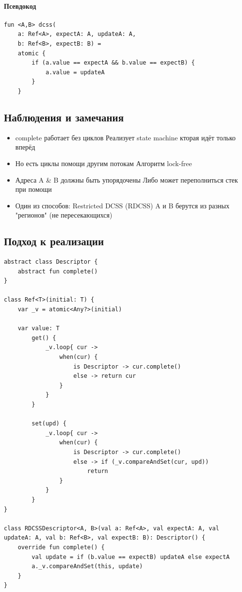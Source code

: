\documentclass[10pt,a4paper,oneside,titlepage]{article}
\theoremstyle{plain}
\theoremstyle{defenition}
\begin{document}
\paragraph{Псевдокод}

\begin{lstlisting}
fun <A,B> dcss(
    a: Ref<A>, expectA: A, updateA: A,
    b: Ref<B>, expectB: B) =
    atomic {
        if (a.value == expectA && b.value == expectB) {
            a.value = updateA
        }
    }
\end{lstlisting}

\subsection{Наблюдения и замечания}

\begin{itemize}
	\item complete работает без циклов
	\subitem Реализует state machine кторая идёт только вперёд
	\item Но есть циклы помощи другим потокам
	\subitem Алгоритм lock-free
	\item Адреса A \& B должны быть упорядочены
	\subitem Либо может переполниться стек при помощи
	\item Один из способов: Restricted DCSS (RDCSS)
	\subitem A и B берутся из разных "регионов" (не пересекающихся) 
\end{itemize}

\subsection{Подход к реализации}

\begin{lstlisting}
abstract class Descriptor {
    abstract fun complete()
}

class Ref<T>(initial: T) {
    var _v = atomic<Any?>(initial)
    
    var value: T
        get() {
            _v.loop{ cur -> 
                when(cur) {
                    is Descriptor -> cur.complete()
                    else -> return cur
                }
            }
        }
        
        set(upd) {
            _v.loop{ cur ->
                when(cur) {
                    is Descriptor -> cur.complete()
                    else -> if (_v.compareAndSet(cur, upd))
                        return
                }
            }
        }
}

class RDCSSDescriptor<A, B>(val a: Ref<A>, val expectA: A, val updateA: A, val b: Ref<B>, val expectB: B): Descriptor() {
    override fun complete() {
        val update = if (b.value == expectB) updateA else expectA
        a._v.compareAndSet(this, update)
    }
}
\end{lstlisting}
\end{document}
